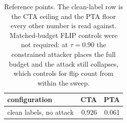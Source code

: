 \begin{table}[t]
\centering
\small
\begin{tabular}{lrr}
\toprule
configuration & CTA & PTA \\
\midrule
clean labels, no attack & 0.926 & 0.061 \\
\bottomrule
\end{tabular}
\caption{Reference points. The clean-label row is the CTA ceiling and the PTA floor every other number is read against. Matched-budget FLIP controls were not required: at $\tau = 0.90$ the constrained attacker places the full budget and the attack still collapses, which controls for flip count from within the sweep.}
\label{tab:controls}
\end{table}
